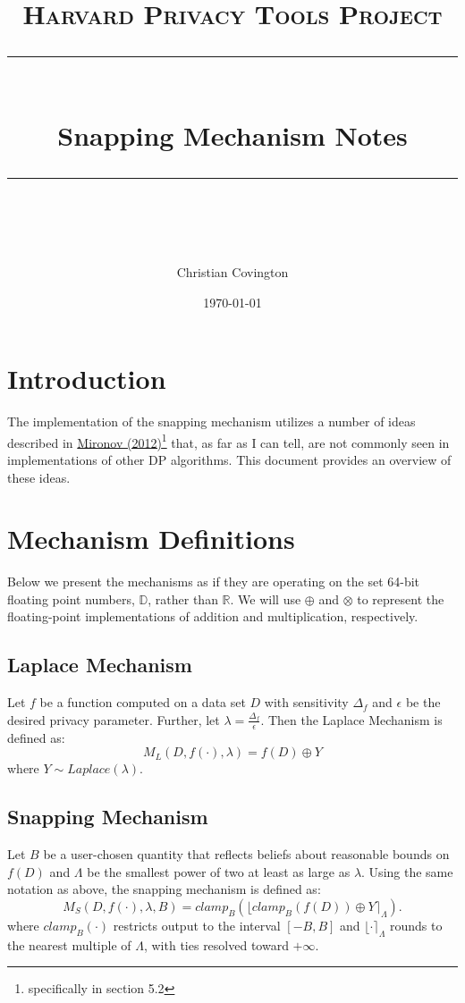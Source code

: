 \documentclass[11pt]{scrartcl} %
\title{
	\normalfont\normalsize
	\textsc{Harvard Privacy Tools Project}\\ %
	\vspace{25pt} %
	\rule{\linewidth}{0.5pt}\\ %
	\vspace{20pt} %
	{\huge Snapping Mechanism Notes}\\ %
	\vspace{12pt} %
	\rule{\linewidth}{2pt}\\ %
	\vspace{12pt} %
}
\author{\LARGE Christian Covington} %
\date{\normalsize\today} %
\begin{document}
\maketitle %

\section{Introduction}
The implementation of the snapping mechanism utilizes a number of ideas described in \href{http://citeseerx.ist.psu.edu/viewdoc/download?doi=10.1.1.366.5957&rep=rep1&type=pdf}{Mironov (2012)}\footnote{specifically in section 5.2} that, as far as I can tell, are not commonly seen in implementations of other DP algorithms. This document provides an overview of these ideas. \newline

\section{Mechanism Definitions}
Below we present the mechanisms as if they are operating on the set 64-bit floating point numbers, $\mathbb{D}$, rather than $\mathbb{R}$. We will use $\oplus$ and $\otimes$ to represent the floating-point implementations of addition and multiplication, respectively.

\subsection{Laplace Mechanism}
Let $f$ be a function computed on a data set $D$ with sensitivity $\Delta_f$ and $\epsilon$ be the desired privacy parameter. Further, let $\lambda = \frac{\Delta_f}{\epsilon}$. Then the Laplace Mechanism is defined as:
\[ M_{L}(D, f(\cdot), \lambda) = f(D) \oplus Y \]
where $Y \sim Laplace(\lambda)$.

\subsection{Snapping Mechanism}
\label{subsec:snapping}
Let $B$ be a user-chosen quantity that reflects beliefs about reasonable bounds on $f(D)$ and $\Lambda$ be the smallest power of two at least as large as $\lambda$. Using the same notation as above, the snapping mechanism is defined as:
\[ M_{S}(D, f(\cdot), \lambda, B) = clamp_{B}\left( \lfloor clamp_{B}\left( f(D) \right) \oplus Y \rceil_{\Lambda} \right). \]
where $clamp_{B}(\cdot)$ restricts output to the interval $[-B, B]$ and $\lfloor \cdot \rceil_{\Lambda}$ rounds to the nearest multiple of $\Lambda$, with ties resolved toward $+ \infty$.
\end{document}
